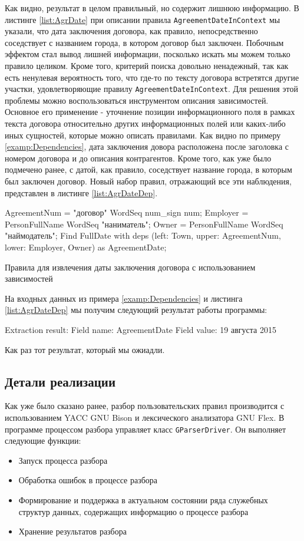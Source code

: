 Как видно, результат в целом правильный, но содержит лишнюю информацию. В листинге \ref{list:AgrDate} при описании правила \lstinline{AgreementDateInContext} мы указали, что дата заключения договора, как правило, непосредственно соседствует с названием города, в котором договор был заключен. Побочным эффектом стал вывод лишней информации, посколько искать мы можем только правило целиком. Кроме того, критерий поиска довольно ненадежный, так как есть ненулевая вероятность того, что где-то по тексту договора встретятся другие участки, удовлетворяющие правилу \lstinline{AgreementDateInContext}. Для решения этой проблемы можно воспользоваться инструментом описания зависимостей. Основное его применение - уточнение позиции информационного поля в рамках текста договора относительно других информационных полей или каких-либо иных сущностей, которые можно описать правилами. Как видно по примеру \ref{examp:Dependencies}, дата заключения довора расположена после заголовка с номером договора и до описания контрагентов. Кроме того, как уже было подмечено ранее, с датой, как правило, соседствует название города, в которым был заключен договор. Новый набор правил, отражающий все эти наблюдения, представлен в листинге \ref{list:AgrDateDep}.
\begin{ListingEnv}
\begin{Verb}
AgreementNum = "договор" WordSeq num_sign num;
Employer = PersonFullName WordSeq "наниматель";
Owner = PersonFullName WordSeq "наймодатель";
Find FullDate 
with deps (left: Town, 
           upper: AgreementNum, 
           lower: Employer, Owner)
as AgreementDate;
\end{Verb}
\caption{Правила для извлечения даты заключения договора с использованием зависимостей}
\label{list:AgrDateDep}
\end{ListingEnv}
На входных данных из примера \ref{examp:Dependencies} и листинга \ref{list:AgrDateDep} мы получим следующий результат работы программы:
\begin{Verb}
Extraction result:
Field name: AgreementDate
Field value: 19 августа 2015
\end{Verb}
Как раз тот результат, который мы ожиадли.

\subsection{Детали реализации}
Как уже было сказано ранее, разбор пользовательских правил производится с использованием YACC GNU Bison и лексического анализатора GNU Flex. В программе процессом разбора управляет класс \lstinline{GParserDriver}. Он выполняет следующие функции:
\begin{itemize}
  \item Запуск процесса разбора
  \item Обработка ошибок в процессе разбора
  \item Формирование и поддержка в актуальном состоянии ряда служебных структур данных, содержащих информацию о процессе разбора
  \item Хранение результатов разбора
\end{itemize}

